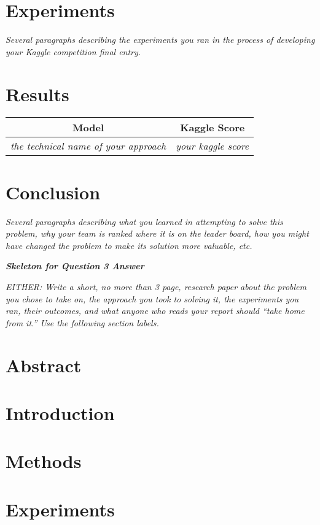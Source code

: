 \documentclass{article}
\begin{document}
\section{Experiments}
\emph{Several paragraphs describing the experiments you ran in the process of developing your Kaggle competition final entry.}
\section{Results}

\begin{center}
 \begin{tabular}{|c | c |} 
 \hline
 Model & Kaggle Score  \\ [0.5ex]
 \hline\hline
 \emph{the technical name of your approach} & \emph{your kaggle score} \\
 \hline
\end{tabular}
\end{center}

\section{Conclusion}
\emph{Several paragraphs describing what you learned in attempting to solve this problem, why your team is ranked where it is on the leader board, how you might have changed the problem to make its solution more valuable, etc.}
\newpage

{\em \bf Skeleton for Question 3 Answer}
\setcounter{section}{0}

\emph{EITHER: Write a short, no more than 3 page, research paper about the problem you chose
to take on, the approach you took to solving it, the experiments you ran,
their outcomes, and what anyone who reads your report should ``take home from it.''  Use the following section labels.}

\section{Abstract}
\section{Introduction}
\section{Methods}
\section{Experiments}
\end{document}
